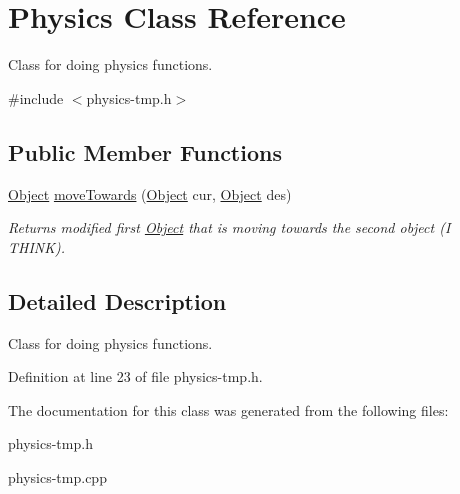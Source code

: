 \hypertarget{classPhysics}{}\section{Physics Class Reference}
\label{classPhysics}


Class for doing physics functions.  




{\ttfamily \#include $<$physics-\/tmp.\+h$>$}

\subsection*{Public Member Functions}
\begin{DoxyCompactItemize}
\item 
\hyperlink{classObject}{Object} \hyperlink{classPhysics_a8e53f9bf088c0d4f208b3c2029d69ab2}{move\+Towards} (\hyperlink{classObject}{Object} cur, \hyperlink{classObject}{Object} des)\hypertarget{classPhysics_a8e53f9bf088c0d4f208b3c2029d69ab2}{}\label{classPhysics_a8e53f9bf088c0d4f208b3c2029d69ab2}

\begin{DoxyCompactList}\small\item\em Returns modified first \hyperlink{classObject}{Object} that is moving towards the second object (I T\+H\+I\+NK). \end{DoxyCompactList}\end{DoxyCompactItemize}


\subsection{Detailed Description}
Class for doing physics functions. 

Definition at line 23 of file physics-\/tmp.\+h.



The documentation for this class was generated from the following files\+:\begin{DoxyCompactItemize}
\item 
physics-\/tmp.\+h\item 
physics-\/tmp.\+cpp\end{DoxyCompactItemize}
